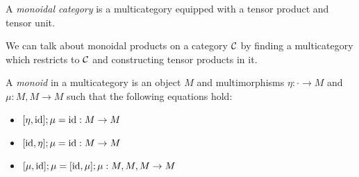 \begin{definition}\label{def:monoidal-category}
  A \emph{monoidal category} is a multicategory equipped with a tensor product
  and tensor unit.
\end{definition}

\begin{remark}
  We can talk about monoidal products on a category $\mathcal C$ by finding a
  multicategory which restricts to $\mathcal C$ and constructing tensor products in it.
\end{remark}

\begin{definition}
  A \emph{monoid} in a multicategory is an object $M$ and multimorphisms
  $\eta : {\cdot} \to M$ and $\mu : M, M \to M$ such that the following
  equations hold:
  \begin{itemize}
    \item $[\eta, \operatorname{id}]; \mu = \operatorname{id} : M \to M$
    \item $[\operatorname{id}, \eta]; \mu = \operatorname{id} : M \to M$
    \item $[\mu, \operatorname{id}]; \mu = [\operatorname{id}, \mu]; \mu : M, M, M \to M$
  \end{itemize}
\end{definition}

